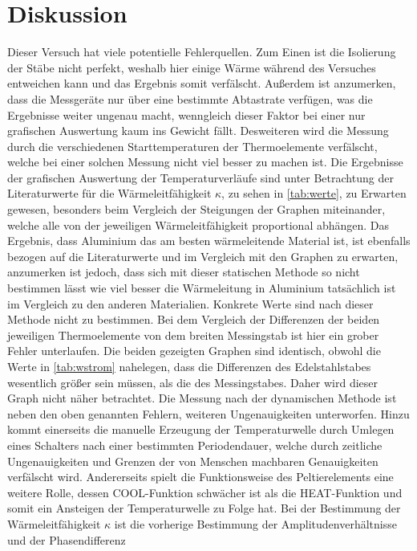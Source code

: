\section{Diskussion}
\label{sec:Diskussion}
Dieser Versuch hat viele potentielle Fehlerquellen. Zum Einen ist die Isolierung der Stäbe nicht perfekt, weshalb hier einige Wärme während
des Versuches entweichen kann und das Ergebnis somit verfälscht. Außerdem ist anzumerken, dass die Messgeräte nur über eine bestimmte Abtastrate
verfügen, was die Ergebnisse weiter ungenau macht, wenngleich dieser Faktor bei einer nur grafischen Auswertung kaum ins Gewicht fällt.
Desweiteren wird die Messung durch die verschiedenen Starttemperaturen der Thermoelemente verfälscht, welche bei einer solchen Messung nicht viel besser zu machen ist.
Die Ergebnisse der grafischen Auswertung der Temperaturverläufe sind unter Betrachtung der Literaturwerte für die Wärmeleitfähigkeit $\kappa$, zu sehen in  
\autoref{tab:werte}, zu Erwarten gewesen, besonders beim Vergleich der Steigungen der Graphen miteinander, welche alle von der jeweiligen Wärmeleitfähigkeit proportional
abhängen. Das Ergebnis, dass Aluminium das am besten wärmeleitende Material ist, ist ebenfalls bezogen auf die Literaturwerte und im Vergleich mit den Graphen
zu erwarten, anzumerken ist jedoch, dass sich mit dieser statischen Methode so nicht bestimmen lässt wie viel besser die Wärmeleitung in Aluminium
tatsächlich ist im Vergleich zu den anderen Materialien. Konkrete Werte sind nach dieser Methode nicht zu bestimmen.
Bei dem Vergleich der Differenzen der beiden jeweiligen Thermoelemente von dem breiten Messingstab ist hier ein grober Fehler unterlaufen.
Die beiden gezeigten Graphen sind identisch, obwohl die Werte in \autoref{tab:wstrom} nahelegen, dass die Differenzen des Edelstahlstabes wesentlich größer
sein müssen, als die des Messingstabes. Daher wird dieser Graph nicht näher betrachtet. 
Die Messung nach der dynamischen Methode ist neben den oben genannten Fehlern, weiteren Ungenauigkeiten unterworfen. Hinzu kommt einerseits die manuelle Erzeugung
der Temperaturwelle durch Umlegen eines Schalters nach einer bestimmten Periodendauer, welche durch zeitliche Ungenauigkeiten und Grenzen der von Menschen machbaren 
Genauigkeiten verfälscht wird. Andererseits spielt die Funktionsweise des Peltierelements eine weitere Rolle, dessen COOL-Funktion schwächer ist als die HEAT-Funktion und somit ein Ansteigen 
der Temperaturwelle zu Folge hat. Bei der Bestimmung der Wärmeleitfähigkeit $\kappa$ ist die vorherige Bestimmung der Amplitudenverhältnisse und der Phasendifferenz
